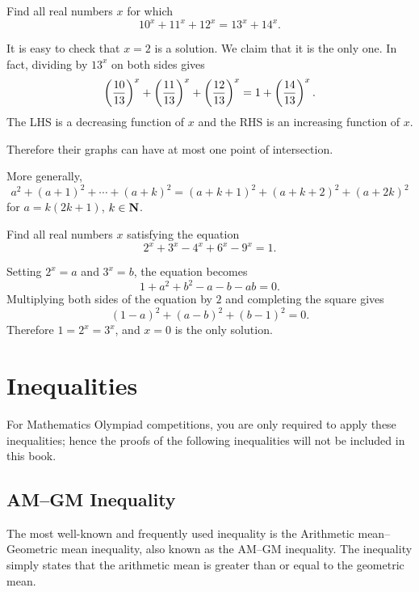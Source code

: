 \begin{prbm}
Find all real numbers $x$ for which
\[ 10^x+11^x+12^x=13^x+14^x. \]
\end{prbm}

\begin{solution}
It is easy to check that $x=2$ is a solution. We claim that it is the only one. In fact, dividing by $13^x$ on both sides gives
\[ \left(\frac{10}{13}\right)^x + \left(\frac{11}{13}\right)^x + \left(\frac{12}{13}\right)^x = 1 + \left(\frac{14}{13}\right)^x. \]
The LHS is a decreasing function of $x$ and the RHS is an increasing function of $x$.

Therefore their graphs can have at most one point of intersection.
\end{solution}

\begin{remark}
More generally,
\[ a^2+(a+1)^2+\cdots+(a+k)^2=(a+k+1)^2+(a+k+2)^2+(a+2k)^2 \]
for $a=k(2k+1)$, $k\in\mathbf N$.
\end{remark}
\pagebreak

\begin{prbm}
Find all real numbers $x$ satisfying the equation
\[ 2^x+3^x-4^x+6^x-9^x=1. \]
\end{prbm}

\begin{solution}
Setting $2^x=a$ and $3^x=b$, the equation becomes
\[ 1+a^2+b^2-a-b-ab=0. \]
Multiplying both sides of the equation by $2$ and completing the square gives
\[ (1-a)^2+(a-b)^2+(b-1)^2=0. \]
Therefore $1=2^x=3^x$, and $x=0$ is the only solution.
\end{solution}

\chapter{Inequalities}
For Mathematics Olympiad competitions, you are only required to apply these inequalities; hence the proofs of the following inequalities will not be included in this book.

\section{AM--GM Inequality}
The most well-known and frequently used inequality is the Arithmetic mean--Geometric mean inequality, also known as the AM--GM inequality. The inequality simply states that the arithmetic mean is greater than or equal to the geometric mean.

